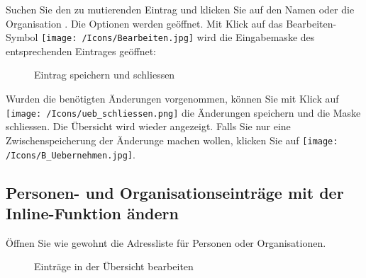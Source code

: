 Suchen Sie den zu mutierenden Eintrag und klicken Sie auf den Namen oder die Organisation . Die Optionen werden geöffnet. Mit Klick auf das Bearbeiten-Symbol \texttt{[image: /Icons/Bearbeiten.jpg]}  wird die Eingabemaske des entsprechenden Eintrages geöffnet:

\begin{figure}[H]
\caption{Eintrag speichern und schliessen}
\end{figure}

Wurden die benötigten Änderungen vorgenommen, können Sie mit Klick auf \texttt{[image: /Icons/ueb\_schliessen.png]}  die Änderungen speichern und die Maske schliessen. Die Übersicht wird wieder angezeigt. Falls Sie nur eine Zwischenspeicherung der Änderunge machen wollen, klicken Sie auf \texttt{[image: /Icons/B\_Uebernehmen.jpg]}.

\pagebreak
\subsection{Personen- und Organisationseinträge mit der Inline-Funktion ändern}

Öffnen Sie wie gewohnt die Adressliste für Personen oder Organisationen.

\begin{figure}[H]
\caption{Einträge in der Übersicht bearbeiten}
\end{figure}

